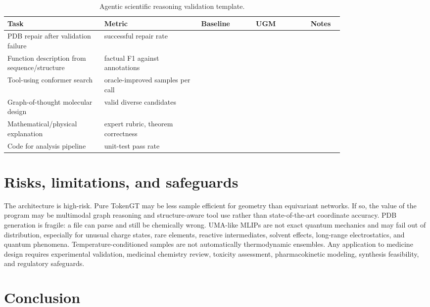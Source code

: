 \documentclass[11pt]{article}
\newcommand{\1}{\mathbf{1}}
\newcommand{\UGM}{\textsc{UGM}}
\begin{document}
\begin{table}[H]
\centering
\caption{Agentic scientific reasoning validation template.}
\scriptsize
\setlength{\tabcolsep}{3pt}
\begin{tabular}{p{0.23\linewidth}p{0.23\linewidth}p{0.13\linewidth}p{0.13\linewidth}p{0.07\linewidth}}
\toprule
Task & Metric & Baseline & \UGM & Notes \\
\midrule
PDB repair after validation failure & successful repair rate & & & \\
Function description from sequence/structure & factual F1 against annotations & & & \\
Tool-using conformer search & oracle-improved samples per call & & & \\
Graph-of-thought molecular design & valid diverse candidates & & & \\
Mathematical/physical explanation & expert rubric, theorem correctness & & & \\
Code for analysis pipeline & unit-test pass rate & & & \\
\bottomrule
\end{tabular}
\end{table}

\section{Risks, limitations, and safeguards}

The architecture is high-risk. Pure TokenGT may be less sample efficient for geometry than equivariant networks. If so, the value of the program may be multimodal graph reasoning and structure-aware tool use rather than state-of-the-art coordinate accuracy. PDB generation is fragile: a file can parse and still be chemically wrong. UMA-like MLIPs are not exact quantum mechanics and may fail out of distribution, especially for unusual charge states, rare elements, reactive intermediates, solvent effects, long-range electrostatics, and quantum phenomena. Temperature-conditioned samples are not automatically thermodynamic ensembles. Any application to medicine design requires experimental validation, medicinal chemistry review, toxicity assessment, pharmacokinetic modeling, synthesis feasibility, and regulatory safeguards.

\section{Conclusion}
\end{document}
